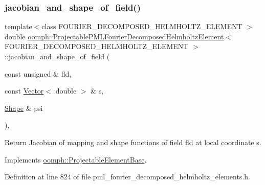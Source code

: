 \subsubsection{\texorpdfstring{jacobian\+\_\+and\+\_\+shape\+\_\+of\+\_\+field()}{jacobian\_and\_shape\_of\_field()}}
{\footnotesize\ttfamily template$<$class F\+O\+U\+R\+I\+E\+R\+\_\+\+D\+E\+C\+O\+M\+P\+O\+S\+E\+D\+\_\+\+H\+E\+L\+M\+H\+O\+L\+T\+Z\+\_\+\+E\+L\+E\+M\+E\+NT $>$ \\
double \hyperlink{classoomph_1_1ProjectablePMLFourierDecomposedHelmholtzElement}{oomph\+::\+Projectable\+P\+M\+L\+Fourier\+Decomposed\+Helmholtz\+Element}$<$ F\+O\+U\+R\+I\+E\+R\+\_\+\+D\+E\+C\+O\+M\+P\+O\+S\+E\+D\+\_\+\+H\+E\+L\+M\+H\+O\+L\+T\+Z\+\_\+\+E\+L\+E\+M\+E\+NT $>$\+::jacobian\+\_\+and\+\_\+shape\+\_\+of\+\_\+field (\begin{DoxyParamCaption}\item[{const unsigned \&}]{fld,  }\item[{const \hyperlink{classoomph_1_1Vector}{Vector}$<$ double $>$ \&}]{s,  }\item[{\hyperlink{classoomph_1_1Shape}{Shape} \&}]{psi }\end{DoxyParamCaption})\hspace{0.3cm}{\ttfamily [inline]}, {\ttfamily [virtual]}}



Return Jacobian of mapping and shape functions of field fld at local coordinate s. 



Implements \hyperlink{classoomph_1_1ProjectableElementBase_ad45c21b58c0985d52f68ab2d79cbb488}{oomph\+::\+Projectable\+Element\+Base}.



Definition at line 824 of file pml\+\_\+fourier\+\_\+decomposed\+\_\+helmholtz\+\_\+elements.\+h.

\mbox{\label{classoomph_1_1ProjectablePMLFourierDecomposedHelmholtzElement_a1802d1737bb3af15f79a8581880c1b55}} 
